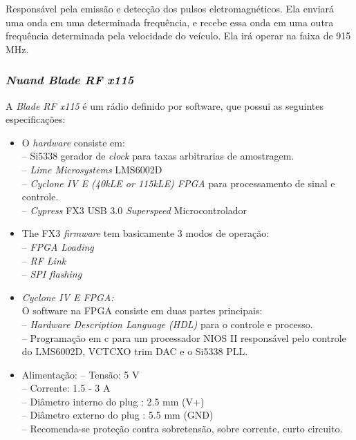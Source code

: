 Responsável pela emissão e detecção dos pulsos eletromagnéticos. Ela enviará uma onda em uma determinada frequência, e recebe essa onda em uma outra frequência determinada pela velocidade do veículo. Ela irá operar na faixa de 915 MHz.

\subsubsection{\emph{Nuand Blade RF x115}}

A \emph{Blade RF x115} é um rádio definido por software, que possui as seguintes especificações:

\begin{itemize}

  \item O \emph{hardware} consiste em:\\
	– Si5338 gerador de \emph{clock} para taxas arbitrarias de amostragem.\\
	–  \emph{Lime Microsystems} LMS6002D\\
	–  \emph{Cyclone IV E (40kLE or 115kLE) FPGA} para processamento de sinal e controle.\\
	–  \emph{Cypress} FX3 USB 3.0 \emph{Superspeed} Microcontrolador\\
  \item	The FX3 \emph{firmware} tem basicamente 3 modos de operação:\\
	– \emph{FPGA Loading}\\
	–  \emph{RF Link}\\
	–  \emph{SPI flashing}
  \item \emph{Cyclone IV E FPGA:}\\
O software na FPGA consiste em duas partes principais:\\
	–  \emph{Hardware Description Language (HDL)} para o controle e processo.\\
	– Programação em c para um processador NIOS II responsável pelo controle do LMS6002D, VCTCXO trim DAC e o Si5338 PLL.
	
  \item Alimentação:
	–  Tensão: 5 V\\
	–  Corrente: 1.5 - 3 A\\
	–  Diâmetro interno do plug : 2.5 mm (V+)\\
	–  Diâmetro externo do plug : 5.5 mm (GND)\\
	–  Recomenda-se proteção contra sobretensão, sobre corrente, curto circuito.
   
\end{itemize}

